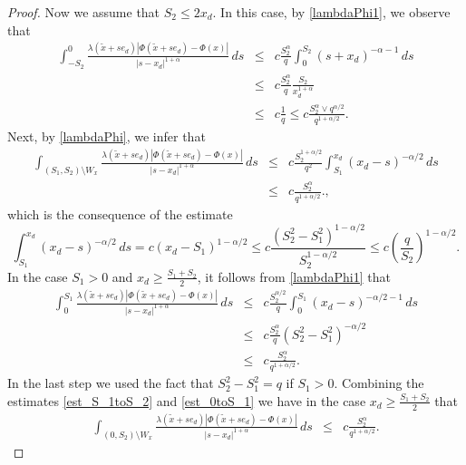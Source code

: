 \documentclass[10pt,a4paper]{amsart}
\begin{document}
\begin{proof}
Now we assume that  $S_2\le 2x_d$. 
In this case,  by \eqref{lambdaPhi1}, we observe that  
\begin{eqnarray}
\int_{-S_2}^{0} 
\frac{\lambda(\tilde{x} + s e_d) |\varPhi(\tilde{x} + s e_d) - \varPhi(x)|}{|s - x_d|^{1 + \alpha}} \, ds 
&\le&  c\frac{S^{\alpha}_2}{q }\int_{0}^{S_2} (s+x_d)^{-\alpha-1}\, ds\nonumber\\
&\le& c\frac{S^{\alpha}_2}{q }\frac {S_2} {x_d^{1+\alpha}} \nonumber\\
&\le& c\frac{1}{q } 
\le c\frac{S^{\alpha}_2\vee q^{\alpha/2}}{q^{1+\alpha/2} }.\label{est-S_2}
\end{eqnarray}
Next, by \eqref{lambdaPhi}, we infer that
\begin{eqnarray}
\int_{(S_1, S_2) \setminus W_x}
\frac{\lambda(\tilde{x} + s e_d) |\varPhi(\tilde{x} + s e_d) - \varPhi(x)|}{|s - x_d|^{1 + \alpha}} \, ds 
&\le&  c\frac{S^{1+\alpha/2}_2}{q^{2} } \int_{S_1}^{ x_d} (x_d - s)^{-\alpha/2}\, ds \nonumber\\
&\le& c\frac{S^{\alpha}_2}{q^{1+\alpha/2} }.\label{est_S_1toS_2}, 
\end{eqnarray} 
which is the consequence of the estimate
$$\int_{S_1}^{ x_d} (x_d - s)^{-\alpha/2}\, ds= c(x_d-S_1)^{1-\alpha/2}\le c\frac{(S^2_2-S^2_1)^{1-\alpha/2}}{S_2^{1-\alpha/2}}\le c \left(\frac{q}{S_2}\right)^{1-\alpha/2}.$$ 
In the case  $S_1 > 0$ and $ x_d\ge \frac{S_1+S_2}2$, it follows from \eqref{lambdaPhi1} that
\begin{eqnarray}
\int_{0}^{S_1} 
\frac{\lambda(\tilde{x} + s e_d) |\varPhi(\tilde{x} + s e_d) - \varPhi(x)|}{|s - x_d|^{1 + \alpha}} \, ds 
&\le&  c\frac{S^{\alpha/2}_2}{q }\int_{0}^{ S_1} (x_d - s)^{-\alpha/2-1}\, ds \nonumber\\
&\le& c\frac{S^{\alpha}_2}{q } (S^2_2-S^2_1)^{-\alpha/2}\nonumber\\
&\le& c\frac{S^{\alpha}_2}{q^{1+\alpha/2} }. \label{est_0toS_1}
\end{eqnarray} 
In the last step we used the fact that $S^2_2-S^2_1=q$ if $S_1>0$. 
Combining  the estimates \eqref{est_S_1toS_2} and \eqref{est_0toS_1}  we have in the case $x_d\ge \frac{S_1+S_2}2$ that
\begin{eqnarray}
\int_{(0, S_2) \setminus W_x}
\frac{\lambda(\tilde{x} + s e_d) |\varPhi(\tilde{x} + s e_d) - \varPhi(x)|}{|s - x_d|^{1 + \alpha}} \, ds 
&\le&  c\frac{S^{\alpha}_2}{q^{1+\alpha/2} }.\label{0toS_2W}
\end{eqnarray}


\end{proof}
\end{document}
